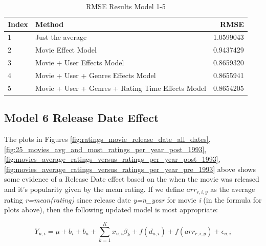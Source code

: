 \documentclass[
]{article}
\begin{document}
\begin{table}[H]

\caption{\label{tab:rte_5}RMSE Results Model 1-5\label{tbl:rmse_results_model_1-5}}
\centering
\fontsize{7}{9}\selectfont
\begin{tabular}[t]{llr}
\toprule
Index & Method & RMSE\\
\midrule
1 & Just the average & 1.0599043\\
2 & Movie Effect Model & 0.9437429\\
3 & Movie + User Effects Model & 0.8659320\\
4 & Movie + User + Genres Effects Model & 0.8655941\\
5 & Movie + User + Genres + Rating Time Effects Model & 0.8654205\\
\bottomrule
\end{tabular}
\end{table}

\newpage

\hypertarget{model-6-release-date-effect}{%
\subsection{Model 6 Release Date
Effect}\label{model-6-release-date-effect}}

The plots in Figures \ref{fig:ratings_movie_release_date_all_dates},
\ref{fig:25_movies_avg_and_most_ratings_per_year_post_1993},
\ref{fig:movies_average_ratings_versus_ratings_per_year_post_1993},
\ref{fig:movies_average_ratings_versus_ratings_per_year_pre_1993} above
shows some evidence of a Release Date effect based on the when the movie
was released and it's popularity given by the mean rating. If we define
\(arr_{r,i,y}\) as the average rating \emph{r=mean(rating)} since
release date \emph{y=n\_year} for movie \emph{i} (in the formula for
plots above), then the following updated model is most appropriate:\\

%
\par

\label{eq:EqModel6-1} \begin{equation}
  Y_{u,i} = \mu + b_{i} + b_{u} + \sum_{k=1}^Kx_{u,i}\beta_k + f(d_{u,i}) + f(arr_{r,i,y}) + \epsilon_{u,i}
\end{equation}
\end{document}
